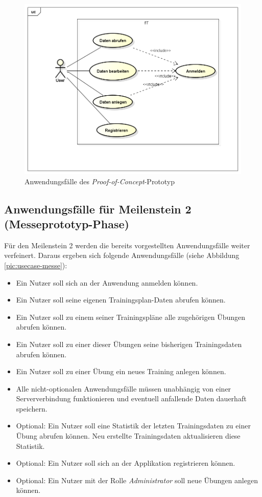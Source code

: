 \begin{figure}[h]
\centering
\includegraphics[width=0.8\linewidth]{content/images/UseCase-Proof-of-Concept.png}
\caption{Anwendungsfälle des \textit{Proof-of-Concept}-Prototyp}
\label{pic:usecase-poc}
\end{figure}

\subsection{Anwendungsfälle für Meilenstein 2 (Messeprototyp-Phase)}
\label{ssec:anwendungsfaelle-messe}
Für den Meilenstein 2 werden die bereits vorgestellten Anwendungsfälle weiter verfeinert. Daraus ergeben sich folgende Anwendungsfälle (siehe Abbildung \ref{pic:usecase-messe}):
\begin{itemize}
\item Ein Nutzer soll sich an der Anwendung anmelden können.
\item Ein Nutzer soll seine eigenen Trainingsplan-Daten abrufen können.
\item Ein Nutzer soll zu einem seiner Trainingspläne alle zugehörigen Übungen abrufen können.
\item Ein Nutzer soll zu einer dieser Übungen seine bisherigen Trainingsdaten abrufen können.
\item Ein Nutzer soll zu einer Übung ein neues Training anlegen können.
\item Alle nicht-optionalen Anwendungsfälle müssen unabhängig von einer Serververbindung funktionieren und eventuell anfallende Daten dauerhaft speichern.
\item Optional: Ein Nutzer soll eine Statistik der letzten Trainingsdaten zu einer Übung abrufen können. Neu erstellte Trainingsdaten aktualisieren diese Statistik.
\item Optional: Ein Nutzer soll sich an der Applikation registrieren können.
\item Optional: Ein Nutzer mit der Rolle \textit{Administrator} soll neue Übungen anlegen können.
\end{itemize}

